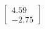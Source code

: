 \documentclass[preview]{standalone}
\begin{document}
\begin{align*}
\begin{bmatrix} 4.59 \\ -2.75 \end{bmatrix}
\end{align*}
\end{document}

